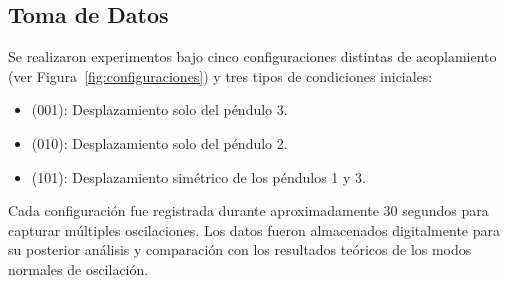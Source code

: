 \subsection{Toma de Datos}

Se realizaron experimentos bajo cinco configuraciones distintas de acoplamiento (ver Figura~\ref{fig:configuraciones}) y tres tipos de condiciones iniciales:

\begin{itemize}
    \item (001): Desplazamiento solo del péndulo 3.
    \item (010): Desplazamiento solo del péndulo 2.
    \item (101): Desplazamiento simétrico de los péndulos 1 y 3.
\end{itemize}

Cada configuración fue registrada durante aproximadamente 30 segundos para capturar múltiples oscilaciones.
Los datos fueron almacenados digitalmente para su posterior análisis y comparación con los resultados teóricos de los modos normales de oscilación.

